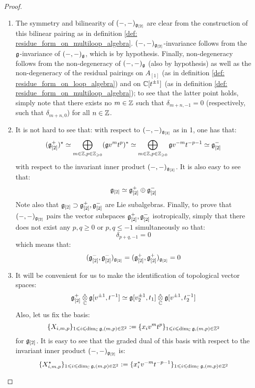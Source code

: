             \begin{proof}
                \begin{enumerate}
                    \item The symmetry and bilinearity of $(-, -)_{\mathfrak{g}_{[2]}}$ are clear from the construction of this bilinear pairing as in definition \ref{def: residue_form_on_multiloop_algebra}. $(-, -)_{\mathfrak{g}_{[2]}}$-invariance follows from the $\mathfrak{g}$-invariance of $(-, -)_{\mathfrak{g}}$, which is by hypothesis. Finally, non-degeneracy follows from the non-degeneracy of $(-, -)_{\mathfrak{g}}$ (also by hypothesis) as well as the non-degeneracy of the residual pairings on $A_{[1]}$ (as in definition \ref{def: residue_form_on_loop_algebra}) and on $\mathbb{C}[t^{\pm 1}]$ (as in definition \ref{def: residue_form_on_multiloop_algebra}); to see that the latter point holds, simply note that there exists no $m \in \mathbb{Z}$ such that $\delta_{m + n, - 1} = 0$ (respectively, such that $\delta_{m + n, 0}$) for all $n \in \mathbb{Z}$.
                    \item It is not hard to see that: with respect to $(-, -)_{\mathfrak{g}_{[2]}}$ as in 1, one has that:
                        $$(\mathfrak{g}_{[2]}^+)^{\star} \simeq \bigoplus_{m \in \mathbb{Z}, p \in \mathbb{Z}_{\geqslant 0}} (\mathfrak{g} v^m t^p)^* \simeq \bigoplus_{m \in \mathbb{Z}, p \in \mathbb{Z}_{\geqslant 0}} \mathfrak{g} v^{-m} t^{-p - 1} \simeq \mathfrak{g}_{[2]}^-$$
                    with respect to the invariant inner product $(-, -)_{\mathfrak{g}_{[2]}}$. It is also easy to see that:
                        $$\mathfrak{g}_{[2]} \simeq \mathfrak{g}_{[2]}^+ \oplus \mathfrak{g}_{[2]}^-$$
                    Note also that $\mathfrak{g}_{[2]} \supset \mathfrak{g}_{[2]}^+, \mathfrak{g}_{[2]}^-$ are Lie subalgebras. Finally, to prove that $(-, -)_{\mathfrak{g}_{[2]}}$ pairs the vector subspaces $\mathfrak{g}_{[2]}^+, \mathfrak{g}_{[2]}^-$ isotropically, simply that there does not exist any $p, q \geq 0$ or $p, q \leq -1$ simultaneously so that:
                        $$\delta_{p + q, -1} = 0$$
                    which means that:
                        $$(\mathfrak{g}_{[2]}^-, \mathfrak{g}_{[2]}^-)_{\mathfrak{g}_{[2]}} = (\mathfrak{g}_{[2]}^+, \mathfrak{g}_{[2]}^+)_{\mathfrak{g}_{[2]}} = 0$$
                    \item It will be convenient for us to make the identification of topological vector spaces:
                        $$\g_{[2]}^+ \hattensor_{\bbC} \g[v^{\pm 1}, t^{-1}] \cong \g[v_2^{\pm 1}, t_1] \hattensor_{\bbC} \g[v^{\pm 1}, t_2^{-1}]$$
                    Also, let us fix the basis:
                        $$\{X_{i, m, p}\}_{1 \leqslant i \leqslant \dim_{\mathbb{C}} \mathfrak{g}, (m, p) \in \mathbb{Z}^2} := \{x_i v^m t^p\}_{1 \leqslant i \leqslant \dim_{\mathbb{C}} \mathfrak{g}, (m, p) \in \mathbb{Z}^2}$$
                    for $\mathfrak{g}_{[2]}$. It is easy to see that the graded dual of this basis with respect to the invariant inner product $(-, -)_{\mathfrak{g}_{[2]}}$ is:
                        $$\{X_{i, m, p}^{\star}\}_{1 \leqslant i \leqslant \dim_{\mathbb{C}} \mathfrak{g}, (m, p) \in \mathbb{Z}^2} := \{x_i^* v^{-m} t^{-p - 1}\}_{1 \leqslant i \leqslant \dim_{\mathbb{C}} \mathfrak{g}, (m, p) \in \mathbb{Z}^2}$$
                    

\end{enumerate}
\end{proof}
